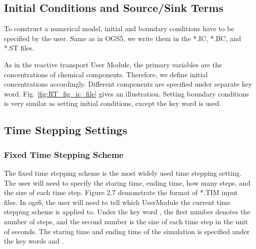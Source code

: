 \subsection{Initial Conditions and Source/Sink Terms}

To construct a numerical model, initial and boundary conditions have to be specified by the user. Same as in OGS5, we write them in the *.IC, *.BC, and *.ST files. 

As in the reactive transport User Module, the primary variables are the concentrations of chemical components. Therefore, we define initial concentrations accordingly. Different components are specified under separate  key word. Fig. \ref{fig:RT_fig_ic_file} gives an illustration. Setting boundary conditions is very similar as setting initial conditions, except the key word  is used. 

\subsection{Time Stepping Settings}

\subsubsection{Fixed Time Stepping Scheme}

The fixed time stepping scheme is the most widely used time stepping setting. The user will need to specify the staring time, ending time, how many steps, and the size of each time step. Figure 2.7 demonstrate the format of *.TIM input files. In ogs6, the user will need to tell which UserModule the current time stepping scheme is applied to. Under the key word , the first number denotes the number of steps, and the second number is the size of each time step in the unit of seconds. The staring time and ending time of the simulation is specified under the key words  and . 

